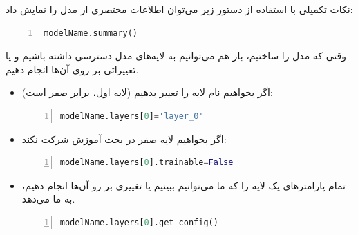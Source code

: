 \documentclass[10pt,xcolor=dvipsnames,professionalfont]{beamer}
\begin{document}
\begin{frame}[fragile]{نکات تکمیلی}
با استفاده از دستور زیر می‌توان اطلاعات مختصری از مدل را نمایش داد:
\begin{latin}
\begin{lstlisting}[language=Python,frame=single,rulecolor=\color{magenta},numbers=left,numberstyle=\tiny]
modelName.summary()
\end{lstlisting}
\end{latin}
وقتی که مدل را ساختیم، باز هم می‌توانیم به لایه‌های مدل دسترسی داشته باشیم و یا تغییراتی بر روی آن‌ها انجام دهیم.
\begin{itemize}
\item
اگر بخواهیم نام لایه را تغییر بدهیم (لایه اول، برابر صفر است):
\begin{latin}
\begin{lstlisting}[language=Python,frame=single,rulecolor=\color{magenta},numbers=left,numberstyle=\tiny]
modelName.layers[0]='layer_0'
\end{lstlisting}
\end{latin}
\item
اگر بخواهیم لایه صفر در بحث آموزش شرکت نکند:
\begin{latin}
\begin{lstlisting}[language=Python,frame=single,rulecolor=\color{magenta},numbers=left,numberstyle=\tiny]
modelName.layers[0].trainable=False
\end{lstlisting}
\end{latin}

\item
تمام پارامترهای یک لایه را که ما می‌توانیم ببینیم یا تغییری بر رو آن‌ها انجام دهیم، به ما می‌‌دهد.
\begin{latin}
\begin{lstlisting}[language=Python,frame=single,rulecolor=\color{magenta},numbers=left,numberstyle=\tiny]
modelName.layers[0].get_config()
\end{lstlisting}
\end{latin}
\end{itemize}

\end{frame}
\end{document}

